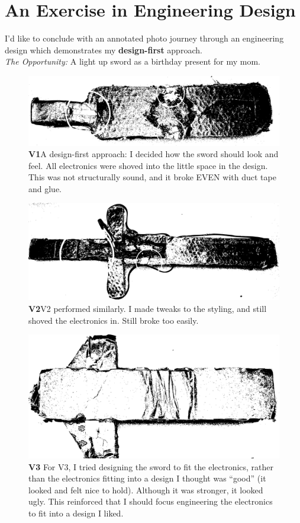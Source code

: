 \documentclass{antiquebook}
\begin{document}
	\chapter{An Exercise in Engineering Design}
	I'd like to conclude with an annotated photo journey through an engineering design which demonstrates my \textbf{design-first} approach. \\[12pt]
	\textit{The Opportunity:} A light up sword as a birthday present for my mom.
	\begin{figure}[H]
		\includegraphics[width=\linewidth]{swordv1.png}
		\caption{\textbf{V1}\quad A design-first approach: I decided how the sword should look and feel. All electronics were shoved into the little space in the design. This was not structurally sound, and it broke EVEN with duct tape and glue.}
	\end{figure}
	\begin{figure}[H]
		\includegraphics[width=\linewidth]{swordv2.png}
		\caption{\textbf{V2}\quad V2 performed similarly. I made tweaks to the styling, and still shoved the electronics in. Still broke too easily.}
	\end{figure}
	\begin{figure}[H]
		\includegraphics[width=\linewidth]{swordv3.png}
		\caption{\textbf{V3} \quad For V3, I tried designing the sword to fit the electronics, rather than the electronics fitting into a design I thought was ``good'' (it looked and felt nice to hold). Although it was stronger, it looked ugly. This reinforced that I should focus engineering the electronics to fit into a design I liked.}
	\end{figure}
\end{document}
